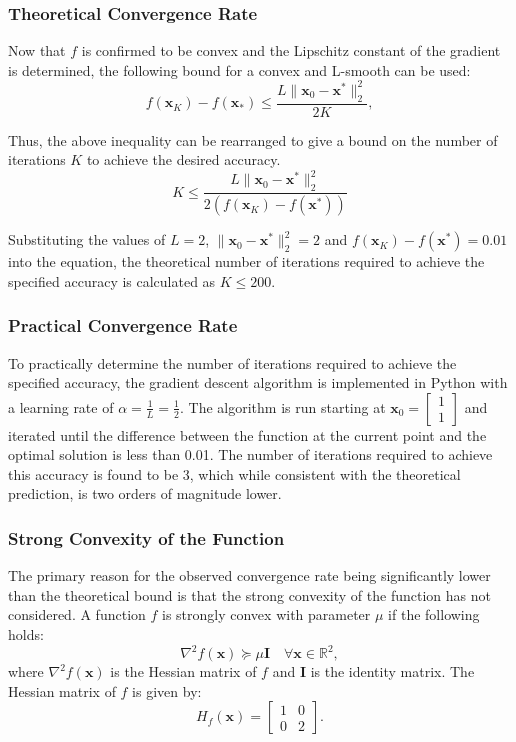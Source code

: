 \documentclass[11pt]{article}
\begin{document}
\subsubsection{Theoretical Convergence Rate}
Now that \(f\) is confirmed to be convex and the Lipschitz constant of the gradient is determined, the following bound for a convex and L-smooth can be used:
$$
    f(\mathbf{x}_K) - f(\mathbf{x}_*) \leq \frac{L \|\mathbf{x}_0 - \mathbf{x}^*\|_2^2}{2K},
$$

Thus, the above inequality can be rearranged to give a bound on the number of iterations $K$ to achieve the desired accuracy. 
\[
K \leq \frac{L \|\mathbf{x}_0 - \mathbf{x}^*\|_2^2}{2(f(\mathbf{x}_K) - f(\mathbf{x}^*))}
\]

Substituting the values of \( L = 2 \), \( \|\mathbf{x}_0 - \mathbf{x}^*\|^2_2 = 2 \) and \(f(\mathbf{x}_K) - f(\mathbf{x}^*) = 0.01 \) into the equation, the theoretical number of iterations required to achieve the specified accuracy is calculated as \( K \leq 200 \).

\subsubsection{Practical Convergence Rate}
To practically determine the number of iterations required to achieve the specified accuracy, the gradient descent algorithm is implemented in Python with a learning rate of \( \alpha = \frac{1}{L} = \frac{1}{2} \). The algorithm is run starting at 
\( \mathbf{x}_0 = \begin{bmatrix} 1 \\ 1 \end{bmatrix} \) and iterated until the difference between the function at the current point and the optimal solution is less than 0.01. The number of iterations required to achieve this accuracy is found to be 3, which while consistent with the theoretical prediction, is two orders of magnitude lower.

\subsubsection{Strong Convexity of the Function}
The primary reason for the observed convergence rate being significantly lower than the theoretical bound is that the strong convexity of the function has not considered. A function \( f \) is strongly convex with parameter \( \mu \) if the following holds:
\[
\nabla^2 f(\mathbf{x}) \succeq \mu \mathbf{I} \quad \forall \mathbf{x} \in \mathbb{R}^2,
\]
where \( \nabla^2 f(\mathbf{x}) \) is the Hessian matrix of \( f \) and \( \mathbf{I} \) is the identity matrix. The Hessian matrix of \( f \) is given by:
\[
H_f(\mathbf{x}) = \begin{bmatrix} 1 & 0 \\ 0 & 2 \end{bmatrix}.
\]
\end{document}
